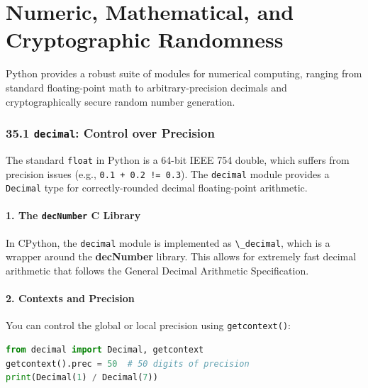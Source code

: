 \hypertarget{numeric-mathematical-and-cryptographic-randomness}{%
\chapter{Numeric, Mathematical, and Cryptographic
Randomness}\label{numeric-mathematical-and-cryptographic-randomness}}

Python provides a robust suite of modules for numerical computing,
ranging from standard floating-point math to arbitrary-precision
decimals and cryptographically secure random number generation.

\hypertarget{decimal-control-over-precision}{%
\subsection{\texorpdfstring{35.1 \texttt{decimal}: Control over
Precision}{35.1 decimal: Control over Precision}}\label{decimal-control-over-precision}}

The standard \passthrough{\lstinline!float!} in Python is a 64-bit IEEE
754 double, which suffers from precision issues (e.g.,
\passthrough{\lstinline"0.1 + 0.2 != 0.3"}). The
\passthrough{\lstinline!decimal!} module provides a
\passthrough{\lstinline!Decimal!} type for correctly-rounded decimal
floating-point arithmetic.

\hypertarget{the-decnumber-c-library}{%
\subsubsection{\texorpdfstring{1. The \texttt{decNumber} C
Library}{1. The decNumber C Library}}\label{the-decnumber-c-library}}

In CPython, the \passthrough{\lstinline!decimal!} module is implemented
as \passthrough{\lstinline!\_decimal!}, which is a wrapper around the
\textbf{decNumber} library. This allows for extremely fast decimal
arithmetic that follows the General Decimal Arithmetic Specification.

\hypertarget{contexts-and-precision}{%
\subsubsection{2. Contexts and Precision}\label{contexts-and-precision}}

You can control the global or local precision using
\passthrough{\lstinline!getcontext()!}:

\begin{lstlisting}[language=Python]
from decimal import Decimal, getcontext
getcontext().prec = 50  # 50 digits of precision
print(Decimal(1) / Decimal(7))
\end{lstlisting}

